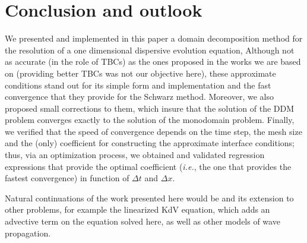 \section{Conclusion and outlook}

\indent We presented and implemented in this paper a domain decomposition method  for the resolution of a one dimensional dispersive evolution equation,  Although not as accurate (in the role of TBCs) as the ones proposed in the works we are based on (providing better TBCs was not our objective here), these approximate conditions stand out for its simple form and implementation and the fast convergence that they provide for the Schwarz method. Moreover, we also proposed small corrections to them, which insure that the solution of the DDM problem converges exactly to the solution of the monodomain problem. Finally, we verified that the speed of convergence depends on the time step, the mesh size and the (only) coefficient for constructing the approximate interface conditions; thus, via an optimization process, we obtained and validated regression expressions that provide the optimal coefficient (\emph{i.e.}, the one that provides the fastest convergence) in function of $\Delta t $ and $\Delta x$.

\indent Natural continuations of the work presented here would be  and its extension to other problems, for example the linearized KdV equation, which adds an advective term on the equation solved here, as well as other models of wave propagation.
